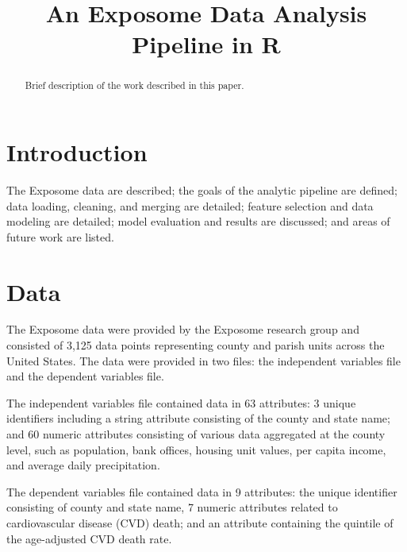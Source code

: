 \documentclass[conference,compsoc]{IEEEtran}
\begin{document}
\title{An Exposome Data Analysis Pipeline in R}

\author{
}

\maketitle

\begin{abstract}
Brief description of the work described in this paper.
\end{abstract}

\section{Introduction}

The Exposome data are described; the goals of the analytic pipeline are defined; data loading,
cleaning, and merging are detailed; feature selection and data modeling are detailed; model evaluation and results are discussed;
and areas of future work are listed.

\section{Data}

The Exposome data were provided by the Exposome research group and consisted of 3,125 data points representing county and parish units across the
United States. The data were provided in two files: the independent variables file and the dependent variables file.

The independent variables file contained data in 63 attributes: 3 unique identifiers including a string attribute consisting of the county and state name;
and 60 numeric attributes consisting of various data aggregated at the county level, such as population, bank offices, housing unit values, per capita income,
and average daily precipitation.

The dependent variables file contained data in 9 attributes: the unique identifier consisting of county and state name, 7 numeric attributes related to cardiovascular
disease (CVD) death; and an attribute containing the quintile of the age-adjusted CVD death rate.
\end{document}
